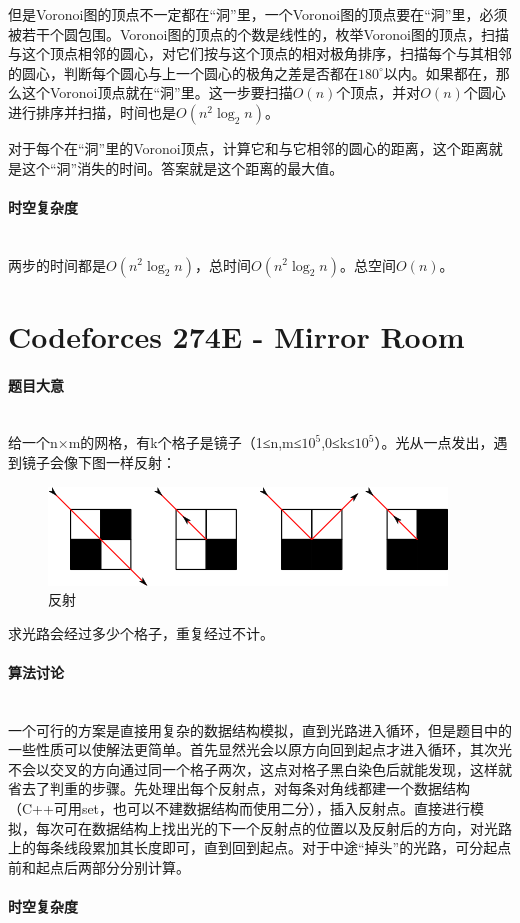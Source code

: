 \documentclass[UTF8]{ctexart}
\newcommand{\myparagraph}[1]{\paragraph{#1}\mbox{}\\}
\theoremstyle{nonumberplain}
\begin{document}
			但是Voronoi图的顶点不一定都在“洞”里，一个Voronoi图的顶点要在“洞”里，必须被若干个圆包围。Voronoi图的顶点的个数是线性的，枚举Voronoi图的顶点，扫描与这个顶点相邻的圆心，对它们按与这个顶点的相对极角排序，扫描每个与其相邻的圆心，判断每个圆心与上一个圆心的极角之差是否都在$180^\circ$以内。如果都在，那么这个Voronoi顶点就在“洞”里。这一步要扫描$O(n)$个顶点，并对$O(n)$个圆心进行排序并扫描，时间也是$O(n^2\log_2n)$。
			
			对于每个在“洞”里的Voronoi顶点，计算它和与它相邻的圆心的距离，这个距离就是这个“洞”消失的时间。答案就是这个距离的最大值。
		
		\myparagraph{时空复杂度}
		
			两步的时间都是$O(n^2\log_2n)$，总时间$O(n^2\log_2n)$。总空间$O(n)$。
	
	\section{Codeforces 274E - Mirror Room}
		
		\myparagraph{题目大意}
			
			给一个n×m的网格，有k个格子是镜子（1≤n,m≤$10^5$,0≤k≤$10^5$）。光从一点发出，遇到镜子会像下图一样反射：
			
			\begin{figure}[ht]
				\centering
				\includegraphics[width=\textwidth]{fig274e_1.png}
				\caption{反射}
			\end{figure}
			
			求光路会经过多少个格子，重复经过不计。
			
		\myparagraph{算法讨论}
		
			一个可行的方案是直接用复杂的数据结构模拟，直到光路进入循环，但是题目中的一些性质可以使解法更简单。首先显然光会以原方向回到起点才进入循环，其次光不会以交叉的方向通过同一个格子两次，这点对格子黑白染色后就能发现，这样就省去了判重的步骤。先处理出每个反射点，对每条对角线都建一个数据结构（C++可用set，也可以不建数据结构而使用二分），插入反射点。直接进行模拟，每次可在数据结构上找出光的下一个反射点的位置以及反射后的方向，对光路上的每条线段累加其长度即可，直到回到起点。对于中途“掉头”的光路，可分起点前和起点后两部分分别计算。
		
		\myparagraph{时空复杂度}
		
\end{document}
